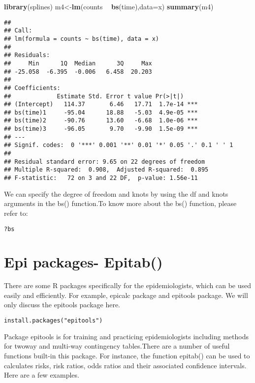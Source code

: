 \documentclass[]{book}
\newenvironment{Shaded}{\begin{snugshade}}{\end{snugshade}}
\newcommand{\KeywordTok}[1]{\textcolor[rgb]{0.13,0.29,0.53}{\textbf{#1}}}
\newcommand{\DataTypeTok}[1]{\textcolor[rgb]{0.13,0.29,0.53}{#1}}
\newcommand{\StringTok}[1]{\textcolor[rgb]{0.31,0.60,0.02}{#1}}
\newcommand{\OperatorTok}[1]{\textcolor[rgb]{0.81,0.36,0.00}{\textbf{#1}}}
\newcommand{\NormalTok}[1]{#1}
\theoremstyle{definition}
\theoremstyle{definition}
\theoremstyle{definition}
\theoremstyle{remark}
\begin{document}
\begin{Shaded}
\begin{Highlighting}[]
\KeywordTok{library}\NormalTok{(splines)}
\NormalTok{m4<-}\KeywordTok{lm}\NormalTok{(counts }\OperatorTok{~}\StringTok{ }\KeywordTok{bs}\NormalTok{(time),}\DataTypeTok{data=}\NormalTok{x)}
\KeywordTok{summary}\NormalTok{(m4)}
\end{Highlighting}
\end{Shaded}

\begin{verbatim}
## 
## Call:
## lm(formula = counts ~ bs(time), data = x)
## 
## Residuals:
##     Min      1Q  Median      3Q     Max 
## -25.058  -6.395  -0.006   6.458  20.203 
## 
## Coefficients:
##             Estimate Std. Error t value Pr(>|t|)    
## (Intercept)   114.37       6.46   17.71  1.7e-14 ***
## bs(time)1     -95.04      18.88   -5.03  4.9e-05 ***
## bs(time)2     -90.76      13.60   -6.68  1.0e-06 ***
## bs(time)3     -96.05       9.70   -9.90  1.5e-09 ***
## ---
## Signif. codes:  0 '***' 0.001 '**' 0.01 '*' 0.05 '.' 0.1 ' ' 1
## 
## Residual standard error: 9.65 on 22 degrees of freedom
## Multiple R-squared:  0.908,  Adjusted R-squared:  0.895 
## F-statistic:   72 on 3 and 22 DF,  p-value: 1.56e-11
\end{verbatim}

We can specify the degree of freedom and knots by using the df and knots
arguments in the bs() function.To know more about the bs() function,
please refer to:

\begin{verbatim}
?bs
\end{verbatim}

\section{Epi packages- Epitab()}\label{epi-packages--epitab}

There are some R packages specifically for the epidemiologists, which
can be used easily and efficiently. For example, epicalc package and
epitools package. We will only discuss the epitools package here.

\begin{verbatim}
install.packages("epitools")
\end{verbatim}

Package epitools is for training and practicing epidemiologists
including methods for twoway and multi-way contingency tables.There are
a number of useful functions built-in this package. For instance, the
function epitab() can be used to calculates risks, risk ratios, odds
ratios and their associated confidence intervals. Here are a few
examples.
\end{document}
